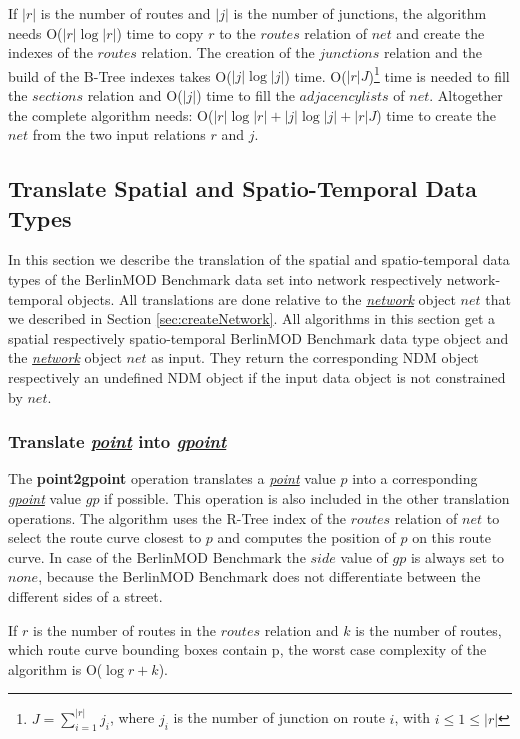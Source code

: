 \documentclass[a4paper]{article}
\newcommand{\bmodb} {BerlinMOD Benchmark}
\newcommand{\op}[1]{\textbf{#1}}
\newcommand{\dt}[1]{\textsl{\underline{#1}}}
\begin{document}
{If $|r|$ is the number of routes and $|j|$ is the number of junctions,
the algorithm needs O($|r| \log |r|$) time to copy $r$ to the
$routes$ relation of $net$ and create the indexes of the
$routes$ relation. The creation of the $junctions$ relation and the build
of the B-Tree indexes takes O($|j| \log |j|$) time.
O($|r|J$)\footnote{$J = \sum_{i=1}^{|r|}{j_i}$, where $j_i$ is the number of
junction on route $i$, with $i \leq 1 \leq |r|$} time is needed to fill the
$sections$ relation and O($|j|$) time to fill the $adjacency lists$ of $net$.
Altogether the complete algorithm needs:
O($|r| \log |r|+|j| \log |j| + |r|J$) time to create the $net$ from the two input
relations $r$ and $j$.
\subsection{Translate Spatial and Spatio-Temporal Data Types}
\label{sec:translateSTdata}
In this section we describe the translation of the spatial and spatio-temporal
data types of the \bmodb{} data set into network respectively network-temporal
objects. All translations are done relative to the \dt{network} object $net$ that
we described in Section \ref{sec:createNetwork}.
All algorithms in this section get a spatial respectively spatio-temporal \bmodb{}
data type object and the \dt{network} object $net$ as input. They return the
corresponding NDM object respectively an undefined NDM object if the input data
object is not constrained by $net$.
\subsubsection{Translate \dt{point} into \dt{gpoint}}
The \op{point2gpoint} operation translates a \dt{point} value $p$ into a corresponding
\dt{gpoint} value $gp$ if possible. This operation is also included in the other translation
operations. The algorithm uses the R-Tree index of the
$routes$ relation of $net$ to select the route curve closest to $p$ and computes the
position of $p$ on this route curve. In case of the \bmodb{} the $side$ value of
$gp$ is always set to $none$, because the \bmodb{} does not differentiate between
the different sides of a street.

If $r$ is the number of routes in the $routes$ relation
and $k$ is the number of routes, which route curve bounding boxes contain p,
the worst case complexity of the algorithm is O($\log{r} + k$).

}
\end{document}
